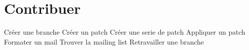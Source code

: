%
%
%

\part{Contribuer}

  Créer une branche
  Créer un patch
  Créer une serie de patch
  Appliquer un patch
  Formater un mail
  Trouver la mailing list
  Retravailler une branche



